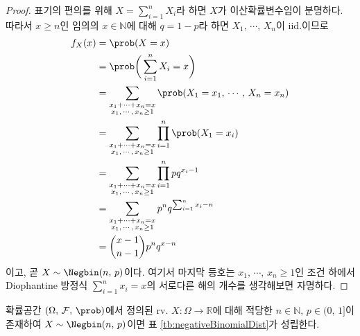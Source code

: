 \begin{proof}
    표기의 편의를 위해 $X=\sum_{i=1}^nX_i$라 하면 $X$가 이산확률변수임이 분명하다. 따라서 $x\geq n$인 임의의 $x\in\mathbb{N}$에 대해 $q=1-p$라 하면 $X_1,\,\cdots,\,X_n$이 iid.이므로
    \begin{align*}
        f_X(x)&=\prob(X=x)\\
        &=\prob\bigg(\sum_{i=1}^nX_i=x\bigg)\\
        &=\sum_{\substack{x_1+\cdots+x_n=x\\ x_1,\,\cdots,\,x_n\geq1}}\prob(X_1=x_1,\,\cdots,\,X_n=x_n)\\
        &=\sum_{\substack{x_1+\cdots+x_n=x\\ x_1,\,\cdots,\,x_n\geq1}}\prod_{i=1}^n\prob(X_1=x_i)\\
        &=\sum_{\substack{x_1+\cdots+x_n=x\\ x_1,\,\cdots,\,x_n\geq1}}\prod_{i=1}^npq^{x_i-1}\\
        &=\sum_{\substack{x_1+\cdots+x_n=x\\ x_1,\,\cdots,\,x_n\geq1}}p^nq^{\sum_{i=1}^nx_i-n}\\
        &=\binom{x-1}{n-1}p^nq^{x-n}
    \end{align*}
    이고, 곧 $X\sim\Negbin(n,\,p)$이다. 여기서 마지막 등호는 $x_1,\,\cdots,\,x_n\geq1$인 조건 하에서 Diophantine 방정식 $\sum_{i=1}^nx_i=x$의 서로다른 해의 개수를 생각해보면 자명하다.
\end{proof}

\begin{theorem}
    확률공간 $(\Omega,\,\mathcal{F},\,\prob)$에서 정의된 rv. $X:\Omega\to\mathbb{R}$에 대해 적당한 $n\in\mathbb{N},\,p\in(0,\,1]$이 존재하여 $X\sim\Negbin(n,\,p)$이면 표 \ref{tb:negativeBinomialDist}가 성립한다.
\end{theorem}

